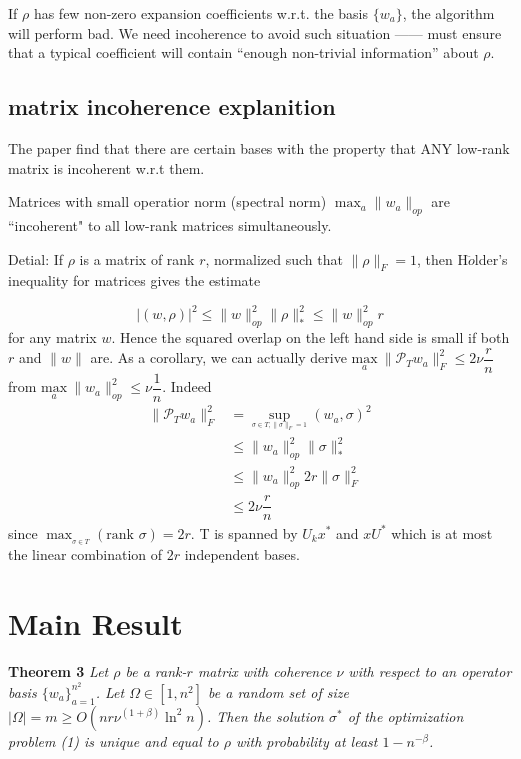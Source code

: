 \documentclass{article}
\begin{document}
If $\rho$ has few non-zero expansion coefficients w.r.t. the basis $\{w_a\}$, the algorithm will perform bad. We need  incoherence to avoid such situation ------ must ensure that a typical coefficient will contain ``enough non-trivial information'' about $\rho$.
\subsection{matrix incoherence explanition}
The paper find that there are certain bases with the property that ANY low-rank matrix is incoherent w.r.t them.

{\color {blue}Matrices with small operatior norm (spectral norm) $\max_a \|w_a\|_{op}$ are ``incoherent" to all low-rank matrices simultaneously.}

Detial: If $\rho$ is a matrix of rank $r$, normalized such that $\| \rho \|_F = 1$, then H$\ddot{o}$lder's inequality for matrices gives the estimate 

\begin{equation}
|(w,\rho)|^2 \le \|w\|_{op}^2 \|\rho\|_*^2 \le \|w\|_{op}^2 r
\end{equation} 
for any matrix $w$. Hence the squared overlap on the left hand side is small if both $r$ and $\|w\|$ are. As a corollary, we can actually derive $\underset{a} {\mathrm{max}} ~\|\mathcal{P}_Tw_a\|_F^2 \le 2\nu \dfrac{r}{n}$ from $\underset{a} {\mathrm{max}} ~\|w_a\|_{op}^2 \le \nu \dfrac{1}{n}$. Indeed
\begin{align*}
\|\mathcal{P}_T w_a\|_F^2 & = \sup_{_{\sigma\in T,\|\sigma\|_F = 1}}(w_a,\sigma)^2 \\
& \le \|w_a\|_{op}^2\|\sigma\|_*^2\\
& \le \|w_a\|_{op}^2 2r\|\sigma\|_F^2\\
& \le 2\nu\dfrac{r}{n}
\end{align*}
since $\max_{_{\sigma\in T}}(\text{rank }\sigma) = 2r $. T is spanned by $U_kx^*$ and $xU^*$ which is at most the linear combination of $2r$ independent bases.


\section{Main Result}
\textbf{Theorem 3} \textit{Let $\rho$ be a rank-$r$ matrix with coherence $\nu$ with respect to an operator basis $\lbrace w_a \rbrace_{a=1}^{n^2}$. Let $\Omega \in [1,n^2]$ be a random set of size $|\Omega|=m \ge O(nr\nu^{(1+\beta)}\ln^2n)$. Then the solution $\sigma^*$ of the optimization problem (1) is unique and equal to $\rho$ with probability at least $1-n^{-\beta}$.}
\end{document}
